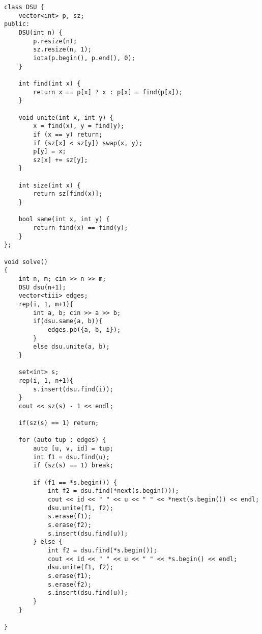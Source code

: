 \begin{lstlisting}
class DSU {
    vector<int> p, sz;
public:
    DSU(int n) {
        p.resize(n);
        sz.resize(n, 1);
        iota(p.begin(), p.end(), 0);
    }

    int find(int x) {
        return x == p[x] ? x : p[x] = find(p[x]);
    }

    void unite(int x, int y) {
        x = find(x), y = find(y);
        if (x == y) return;
        if (sz[x] < sz[y]) swap(x, y);
        p[y] = x;
        sz[x] += sz[y];
    }

    int size(int x) {
        return sz[find(x)];
    }

    bool same(int x, int y) {
        return find(x) == find(y);
    }
};

void solve()
{
    int n, m; cin >> n >> m;
    DSU dsu(n+1);
    vector<tiii> edges;
    rep(i, 1, m+1){
        int a, b; cin >> a >> b;
        if(dsu.same(a, b)){
            edges.pb({a, b, i});
        }
        else dsu.unite(a, b);
    }

    set<int> s;
    rep(i, 1, n+1){
        s.insert(dsu.find(i));
    }
    cout << sz(s) - 1 << endl;

    if(sz(s) == 1) return;

    for (auto tup : edges) {
        auto [u, v, id] = tup;
        int f1 = dsu.find(u);
        if (sz(s) == 1) break;

        if (f1 == *s.begin()) {
            int f2 = dsu.find(*next(s.begin()));
            cout << id << " " << u << " " << *next(s.begin()) << endl;
            dsu.unite(f1, f2);
            s.erase(f1);
            s.erase(f2);
            s.insert(dsu.find(u));
        } else {
            int f2 = dsu.find(*s.begin());
            cout << id << " " << u << " " << *s.begin() << endl;
            dsu.unite(f1, f2);
            s.erase(f1);
            s.erase(f2);
            s.insert(dsu.find(u));
        }
    }

}
\end{lstlisting}